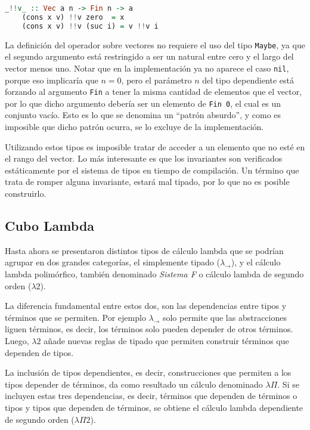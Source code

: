 \begin{lstlisting}[mathescape, language=Haskell, deletekeywords={zero}]
	_!!v_ :: Vec a n -> Fin n -> a
	(cons x v) !!v zero  = x
	(cons x v) !!v (suc i) = v !!v i
\end{lstlisting}

La definición del operador sobre vectores no requiere el uso del tipo \verb|Maybe|, ya que el segundo argumento está restringido a ser un natural entre cero y el largo del vector menos uno.
Notar que en la implementación ya no aparece el caso \verb|nil|, porque eso implicaría que $n = 0$, pero el parámetro $n$ del tipo dependiente está forzando al argumento \verb|Fin| a tener la misma cantidad de elementos que el vector, por lo que dicho argumento debería ser un elemento de \verb|Fin 0|, el cual es un conjunto vacío.
Esto es lo que se denomina un ``patrón absurdo'', y como es imposible que dicho patrón ocurra, se lo excluye de la implementación.

Utilizando estos tipos es imposible tratar de acceder a un elemento que no esté en el rango del vector.
Lo más interesante es que los invariantes son verificados estáticamente por el sistema de tipos en tiempo de compilación.
Un término que trata de romper alguna invariante, estará mal tipado, por lo que no es posible construirlo.


\subsection{Cubo Lambda}
Hasta ahora se presentaron distintos tipos de cálculo lambda que se podrían agrupar en dos grandes categorías, el simplemente tipado ($\lambda_{\to}$), y el cálculo lambda polimórfico, también denominado \textit{Sistema F} o cálculo lambda de segundo orden ($\lambda 2$).

La diferencia fundamental entre estos dos, son las dependencias entre tipos y términos que se permiten.
Por ejemplo $\lambda_{\to}$ solo permite que las abstracciones liguen términos, es decir, los términos solo pueden depender de otros términos.
Luego, $\lambda 2$ añade nuevas reglas de tipado que permiten construir términos que dependen de tipos.

La inclusión de tipos dependientes, es decir, construcciones que permiten a los tipos depender de términos, da como resultado un cálculo denominado $\lambda\Pi$.
Si se incluyen estas tres dependencias, es decir, términos que dependen de términos o tipos y tipos que dependen de términos, se obtiene el cálculo lambda dependiente de segundo orden ($\lambda\Pi 2$).


